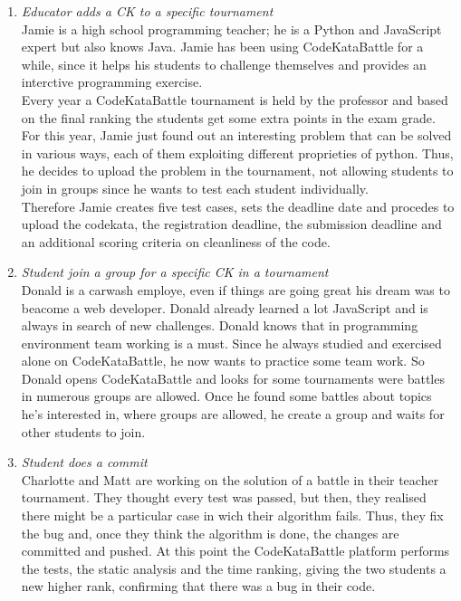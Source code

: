 \documentclass[12pt, a4paper]{report}
\begin{document}
\begin{enumerate}
        \item \textit{Educator adds a CK to a specific tournament} \\
        Jamie is a high school programming teacher; he is a Python and JavaScript expert but also knows Java.
        Jamie has been using CodeKataBattle for a while, since it helps his students to challenge themselves 
        and provides an interctive programming exercise.\\
        Every year a CodeKataBattle tournament is held by the professor and based on the final ranking
        the students get some extra points in the exam grade.\\ 
        For this year, Jamie just found out an interesting problem that can be solved in various ways, each of them exploiting different proprieties of python.
        Thus, he decides to upload the problem in the tournament, not allowing students to join in groups
        since he wants to test each student individually.\\
        Therefore Jamie creates five test cases, sets the deadline date and procedes to upload the codekata, the registration deadline, the submission deadline
        and an additional scoring criteria on cleanliness of the code.

        \item \textit{Student join a group for a specific CK in a tournament}\\
        Donald is a carwash employe, even if things are going great his dream was to beacome a web developer.
        Donald already learned a lot JavaScript and is always in search of new challenges.
        Donald knows that in programming environment team working is a must.
        Since he always studied and exercised alone on CodeKataBattle, he now wants to practice some team work.
        So Donald opens CodeKataBattle and looks for some tournaments were battles in numerous groups are allowed.
        Once he found some battles about topics he's interested in, where groups are allowed, he create a group and waits for other 
        students to join.

        \item \textit{Student does a commit} \\
        Charlotte and Matt are working on the solution of a battle in their teacher tournament.
        They thought every test was passed, but then, they realised there might be a particular case in wich their algorithm fails.
        Thus, they fix the bug and, once they think the algorithm is done, the changes are committed and pushed.
        At this point the CodeKataBattle platform performs the tests, the static analysis and the time ranking, giving the two students a new higher rank,
        confirming that there was a bug in their code.


\end{enumerate}
\end{document}
